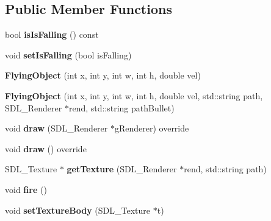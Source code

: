 \subsection*{Public Member Functions}
\begin{DoxyCompactItemize}
\item 
\hypertarget{class_flying_object_a75bf7eef115a12fcc440406220078f3e}{}bool {\bfseries is\+Is\+Falling} () const \label{class_flying_object_a75bf7eef115a12fcc440406220078f3e}

\item 
\hypertarget{class_flying_object_a7a85cdbe612ff033814800a9a3611113}{}void {\bfseries set\+Is\+Falling} (bool is\+Falling)\label{class_flying_object_a7a85cdbe612ff033814800a9a3611113}

\item 
\hypertarget{class_flying_object_ac3aa6af7e597804ca5e3bb1f23ef7bce}{}{\bfseries Flying\+Object} (int x, int y, int w, int h, double vel)\label{class_flying_object_ac3aa6af7e597804ca5e3bb1f23ef7bce}

\item 
\hypertarget{class_flying_object_ae19d46468cfc5223a67404e5ef2899c9}{}{\bfseries Flying\+Object} (int x, int y, int w, int h, double vel, std\+::string path, S\+D\+L\+\_\+\+Renderer $\ast$rend, std\+::string path\+Bullet)\label{class_flying_object_ae19d46468cfc5223a67404e5ef2899c9}

\item 
\hypertarget{class_flying_object_a24ea9f0837fd8d18bbc51bc435ed86c2}{}void {\bfseries draw} (S\+D\+L\+\_\+\+Renderer $\ast$g\+Renderer) override\label{class_flying_object_a24ea9f0837fd8d18bbc51bc435ed86c2}

\item 
\hypertarget{class_flying_object_af58bd62f02039544dfd04c3ef854fb33}{}void {\bfseries draw} () override\label{class_flying_object_af58bd62f02039544dfd04c3ef854fb33}

\item 
\hypertarget{class_flying_object_a0a7125dda78155f497259007ea219314}{}S\+D\+L\+\_\+\+Texture $\ast$ {\bfseries get\+Texture} (S\+D\+L\+\_\+\+Renderer $\ast$rend, std\+::string path)\label{class_flying_object_a0a7125dda78155f497259007ea219314}

\item 
\hypertarget{class_flying_object_a9bc37c29f698d99102173560612f882d}{}void {\bfseries fire} ()\label{class_flying_object_a9bc37c29f698d99102173560612f882d}

\item 
\hypertarget{class_flying_object_a9b75bff7e78524dbb39d398f1f3a8702}{}void {\bfseries set\+Texture\+Body} (S\+D\+L\+\_\+\+Texture $\ast$t)\label{class_flying_object_a9b75bff7e78524dbb39d398f1f3a8702}


\end{DoxyCompactItemize}
